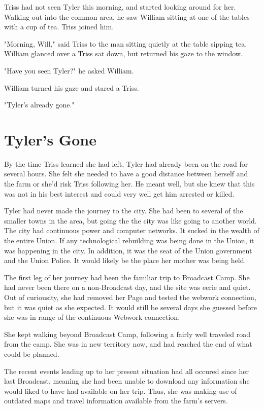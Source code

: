 \documentclass[courier]{sffms}
\begin{document}
Triss had not seen Tyler this morning, and started
looking around for her. Walking out into the common
area, he saw William sitting at one of the tables with
a cup of tea. Triss joined him.

"Morning, Will," said Triss to the man sitting quietly
at the table sipping tea. William glanced over a Triss
sat down, but returned his gaze to the window.

"Have you seen Tyler?" he asked William.

William turned his gaze and stared a Triss.

"Tyler's already gone."

\chapter{Tyler's Gone}
By the time Triss learned she had left, Tyler had already
been on the road for several hours. She felt she needed
to have a good distance between herself and the farm
or she'd risk Triss following her. He meant well, but she
knew that this was not in his best interest and could very
well get him arrested or killed.

Tyler had never made the journey to the city. She had
been to several of the smaller towns in the area, but
going the the city was like going to another world. The
city had continuous power and computer networks. It
sucked in the wealth of the entire Union. If any technological
rebuilding was being done in the Union, it was happening
in the city. In addition, it was the seat of the Union
government and the Union Police. It would likely be the
place her mother was being held.

The first leg of her journey had been the familiar trip to
Broadcast Camp. She had never been there on a
non-Broadcast day, and the site was eerie and quiet.
Out of curiousity, she had removed her Page and tested
the webwork connection, but it was quiet as she expected.
It would still be several days she guessed before she was in
range of the continuous Webwork connection.

She kept walking beyond Broadcast Camp, following a fairly
well traveled road from the camp. She was in new territory
now, and had reached the end of what could be planned.

The recent events leading up to her present situation had
all occured since her last Broadcast, meaning she had been
unable to download any information she would liked to have
had available on her trip. Thus, she was making use of
outdated maps and travel information available from the 
farm's servers.
\end{document}
